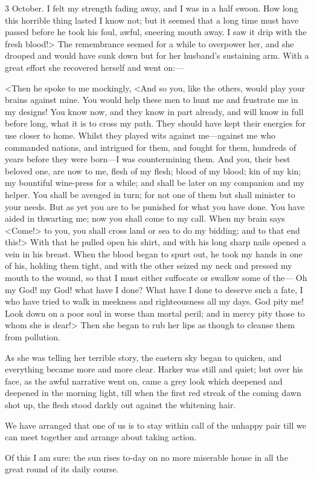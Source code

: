 \begin{diary}{3 October.}
I felt my strength fading away, and I was in a half swoon. How long this horrible thing lasted I know not; but it seemed that a long time must have passed before he took his foul, awful, sneering mouth away. I saw it drip with the fresh blood!> The remembrance seemed for a while to overpower her, and she drooped and would have sunk down but for her husband's sustaining arm. With a great effort she recovered herself and went on:—

<Then he spoke to me mockingly, <And so you, like the others, would play your brains against mine. You would help these men to hunt me and frustrate me in my designs! You know now, and they know in part already, and will know in full before long, what it is to cross my path. They should have kept their energies for use closer to home. Whilst they played wits against me—against me who commanded nations, and intrigued for them, and fought for them, hundreds of years before they were born—I was countermining them. And you, their best beloved one, are now to me, flesh of my flesh; blood of my blood; kin of my kin; my bountiful wine-press for a while; and shall be later on my companion and my helper. You shall be avenged in turn; for not one of them but shall minister to your needs. But as yet you are to be punished for what you have done. You have aided in thwarting me; now you shall come to my call. When my brain says <Come!> to you, you shall cross land or sea to do my bidding; and to that end this!> With that he pulled open his shirt, and with his long sharp nails opened a vein in his breast. When the blood began to spurt out, he took my hands in one of his, holding them tight, and with the other seized my neck and pressed my mouth to the wound, so that I must either suffocate or swallow some of the— Oh my God! my God! what have I done? What have I done to deserve such a fate, I who have tried to walk in meekness and righteousness all my days. God pity me! Look down on a poor soul in worse than mortal peril; and in mercy pity those to whom she is dear!> Then she began to rub her lips as though to cleanse them from pollution.

As she was telling her terrible story, the eastern sky began to quicken, and everything became more and more clear. Harker was still and quiet; but over his face, as the awful narrative went on, came a grey look which deepened and deepened in the morning light, till when the first red streak of the coming dawn shot up, the flesh stood darkly out against the whitening hair.

We have arranged that one of us is to stay within call of the unhappy pair till we can meet together and arrange about taking action.

Of this I am sure: the sun rises to-day on no more miserable house in all the great round of its daily course.
\end{diary}